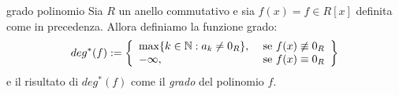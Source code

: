\newpage
\begin{defn}{grado polinomio}
Sia $R$ un anello commutativo e sia $f(x) = f \in R[x]$ definita come in precedenza. Allora definiamo
la funzione grado:
\[
  deg^*(f) := \left\{\begin{array}{lr}
      \max\{k \in \mathbb{N} : a_k \neq 0_R\}, & \text{ se } f(x) \not\equiv 0_R\\
      -\infty, & \text{ se } f(x) \equiv 0_R 
      \end{array}\right\} 
\]
e il risultato di $deg^*(f)$ come il \emph{grado} del polinomio $f$.
\end{defn}
